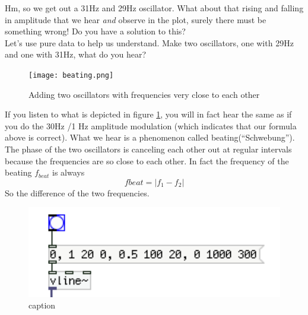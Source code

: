 Hm, so we get out a 31Hz and 29Hz oscillator. What about that rising and falling in amplitude that we hear \textit{and} observe in the plot, surely there must be something wrong! Do you have a solution to this?\\

Let's use pure data to help us understand. Make two oscillators, one with 29Hz and one with 31Hz, what do you hear?

\begin{figure}[h!]
	\centering
	\texttt{[image: beating.png]}
	\caption[adding two oscillators]
	{Adding two oscillators with frequencies very close to each other}
	\label{fig:beating}
\end{figure}

If you listen to what is depicted in figure \ref{fig:beating}, you will in fact hear the same as if you do the 30Hz /1 Hz amplitude modulation (which indicates that our formula above is correct). What we hear is a phenomenon called beating(``Schwebung''). The phase of the two oscillators is canceling each other out at regular intervals because the frequencies are so close to each other. In fact the frequency of the beating $f_{beat}$ is always 
\begin{equation}
	f{beat}=|f_1-f_2|
\end{equation}
So the difference of the two frequencies.



\begin{figure}[H]
	\begin{center}
		\includegraphics[width = 14cm]{img/simpleEnv.png}
		\caption{caption}
		\label{fig:name}
	\end{center}
\end{figure}




